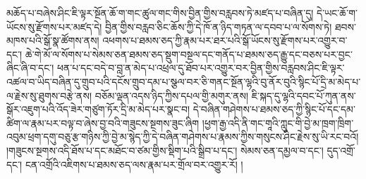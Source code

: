 མཆོད་པ་བཞེས་ཤིང་ཇི་ལྟར་སྔོན་ཆོ་ག་གང་ཚུལ་གང་གིས་བྱིན་གྱིས་བརླབས་ཏེ་མཛད་པ་བཞིན་དུ། དེ་ཡང་ཆོ་ག་ཡོངས་སུ་རྫོགས་པར་མཛད་དེ། བྱིན་གྱིས་བརླབ་ཅིང་ཆོས་ཀྱི་དེ་ཁོ་ན་ཉིད་གཏན་ལ་དབབ་པ་ལ་སོགས་ཏེ། ཐབས་མཁས་པའི་སྒོ་སྣ་ཚོགས་ནས། འཕགས་པ་ཐམས་ཅད་ཀྱི་རྣམ་པར་ཐར་པའི་སྒོ་ཡོངས་སུ་རྫོགས་པར་འགྱུར་བ་དང་། ཆེ་གེ་མོ་ལ་སོགས་པ་སེམས་ཅན་ཐམས་ཅད་སྡུག་བསྔལ་དང་གནོད་པ་ཐམས་ཅད་རྒྱུ་དང་བཅས་པར་བྱང་ཞིང་ཞི་བ་དང་། ཕན་པ་དང་བདེ་བ་བླ་ན་མེད་པ་འཕྲལ་དུ་ཐོབ་པར་འགྱུར་བར་བྱིན་གྱིས་བརླབས་ཤིང་ཇི་ལྟར་འཚལ་བ་ཡིད་བཞིན་དུ་གྲུབ་པའི་དངོས་གྲུབ་དམ་པ་སྩལ་བར་ཅི་གནང་སྔོན་ལྷའི་བུ་ནོར་བུའི་སྙིང་པོ་དྲི་མ་མེད་པ་ལ་རྗེས་སུ་ཐུགས་བརྩེ་ནས། བཅོམ་ལྡན་འདས་ཉིད་ཀྱིས་དཔལ་གྱི་མགུར་ནས། ཇི་སྐད་དུ་ལྷའི་དབང་པོ་ཀུན་ནས་སྒོར་འཇུག་པའི་འོད་ཟེར་གཙུག་ཏོར་དྲི་མ་མེད་པར་སྣང་བ། དེ་བཞིན་གཤེགས་པ་ཐམས་ཅད་ཀྱི་སྙིང་པོ་དང་དམ་ཚིག་ལ་རྣམ་པར་བལྟ་བ་ཞེས་བྱ་བའི་གཟུངས་སྔགས་ཟུང་ཞིག །ཕྱག་རྒྱ་འདི་ནི་གང་གཱའི་ཀླུང་གི་བྱེ་མ་ཁྲག་ཁྲིག་འབུམ་ཕྲག་དགུ་བཅུ་རྩ་གཉིས་ཀྱི་བྱེ་མ་སྙེད་ཀྱི་དེ་བཞིན་གཤེགས་པ་རྣམས་ཀྱིས་གསུངས་ཤིང་རྗེས་སུ་ཡི་རང་བའོ། །གཟུངས་སྔགས་འདི་ཐོས་པ་དང་མཐོང་བ་ཙམ་གྱིས་སྡིག་པའི་སྒྲིབ་པ་དང་། སེམས་ཅན་དམྱལ་བ་དང་། དུད་འགྲོ་དང་། ངན་འགྲོའི་འཇིགས་པ་ཐམས་ཅད་ལས་རྣམ་པར་གྲོལ་བར་འགྱུར་རོ། །
